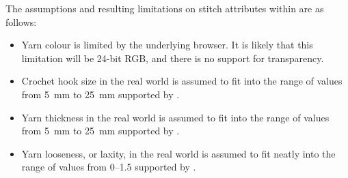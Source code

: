 \documentclass[main.tex]{subfiles}
\begin{document}
The assumptions and resulting limitations on stitch attributes within \CC{} are as follows:

\begin{itemize}
\item Yarn colour is limited by the underlying browser. It is likely that this limitation will be 24-bit RGB, and there is no support for transparency.
\item Crochet hook size in the real world is assumed to fit into the range of values from \qty{5}{mm} to \qty{25}{mm} supported by \CC. 
\item Yarn thickness in the real world is assumed to fit into the range of values from \qty{5}{mm} to \qty{25}{mm} supported by \CC.
\item Yarn looseness, or laxity, in the real world is assumed to fit neatly into the range of values from 0--1.5 supported by \CC.
\end{itemize}
\end{document}
